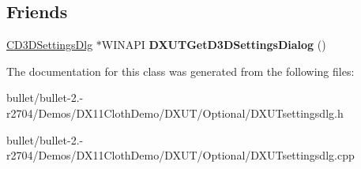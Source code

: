 \subsection*{Friends}
\begin{DoxyCompactItemize}
\item 
\hypertarget{class_c_d3_d_settings_dlg_a803f6b7c8aceef83e286cda998c3e9cb}{\hyperlink{class_c_d3_d_settings_dlg}{C\+D3\+D\+Settings\+Dlg} $\ast$W\+I\+N\+A\+P\+I {\bfseries D\+X\+U\+T\+Get\+D3\+D\+Settings\+Dialog} ()}\label{class_c_d3_d_settings_dlg_a803f6b7c8aceef83e286cda998c3e9cb}

\end{DoxyCompactItemize}


The documentation for this class was generated from the following files\+:\begin{DoxyCompactItemize}
\item 
bullet/bullet-\/2.-\/r2704/\+Demos/\+D\+X11\+Cloth\+Demo/\+D\+X\+U\+T/\+Optional/D\+X\+U\+Tsettingsdlg.\+h\item 
bullet/bullet-\/2.-\/r2704/\+Demos/\+D\+X11\+Cloth\+Demo/\+D\+X\+U\+T/\+Optional/D\+X\+U\+Tsettingsdlg.\+cpp\end{DoxyCompactItemize}
